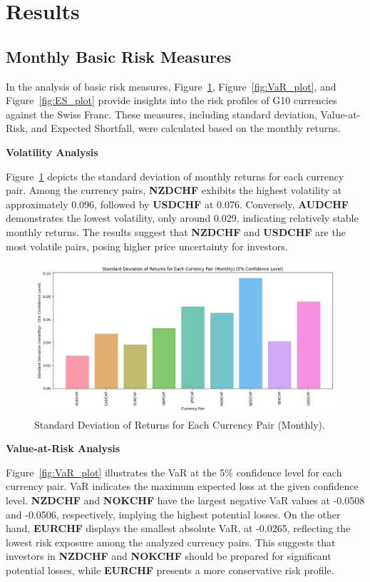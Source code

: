 \documentclass{article}
\begin{document}
\section{Results}
\subsection{Monthly Basic Risk Measures}

In the analysis of basic risk measures, Figure~\ref{fig:volatility_plot}, Figure~\ref{fig:VaR_plot}, and Figure~\ref{fig:ES_plot} provide insights into the risk profiles of G10 currencies against the Swiss Franc. These measures, including standard deviation, Value-at-Risk, and Expected Shortfall, were calculated based on the monthly returns.

\textbf{Volatility Analysis}

Figure~\ref{fig:volatility_plot} depicts the standard deviation of monthly returns for each currency pair. Among the currency pairs, \textbf{NZDCHF} exhibits the highest volatility at approximately 0.096, followed by \textbf{USDCHF} at 0.076. Conversely, \textbf{AUDCHF} demonstrates the lowest volatility, only around 0.029, indicating relatively stable monthly returns. The results suggest that \textbf{NZDCHF} and \textbf{USDCHF} are the most volatile pairs, posing higher price uncertainty for investors.

\begin{figure}[H]
    \centering
    \includegraphics[width=0.75\linewidth]{../../reports/figures/volatility_plot.png}
    \caption{Standard Deviation of Returns for Each Currency Pair (Monthly).}
    \label{fig:volatility_plot}
\end{figure}

\textbf{Value-at-Risk Analysis}

Figure~\ref{fig:VaR_plot} illustrates the VaR at the 5\% confidence level for each currency pair. VaR indicates the maximum expected loss at the given confidence level. \textbf{NZDCHF} and \textbf{NOKCHF} have the largest negative VaR values at -0.0508 and -0.0506, respectively, implying the highest potential losses. On the other hand, \textbf{EURCHF} displays the smallest absolute VaR, at -0.0265, reflecting the lowest risk exposure among the analyzed currency pairs. This suggests that investors in \textbf{NZDCHF} and \textbf{NOKCHF} should be prepared for significant potential losses, while \textbf{EURCHF} presents a more conservative risk profile.
\end{document}
